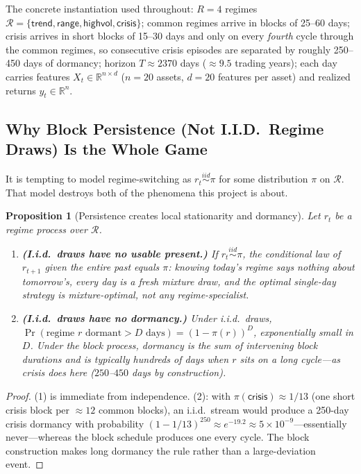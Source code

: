 \documentclass[11pt,a4paper]{article}
\theoremstyle{definition}
\theoremstyle{plain}
\newtheorem{proposition}{Proposition}[section]
\newcommand{\R}{\mathbb{R}}
\begin{document}
The concrete instantiation used throughout: $R = 4$ regimes
$\mathcal{R} = \{\textsf{trend}, \textsf{range}, \textsf{highvol},
\textsf{crisis}\}$; common regimes arrive in blocks of 25--60 days;
\textsf{crisis} arrives in short blocks of 15--30 days and only on every
\emph{fourth} cycle through the common regimes, so consecutive crisis
episodes are separated by roughly 250--450 days of dormancy; horizon
$T \approx 2370$ days ($\approx 9.5$ trading years); each day carries
features $X_t \in \R^{n \times d}$ ($n = 20$ assets, $d = 20$ features per
asset) and realized returns $y_t \in \R^{n}$.

\subsection{Why Block Persistence (Not I.I.D.\ Regime Draws) Is the Whole Game}

It is tempting to model regime-switching as $r_t \stackrel{iid}{\sim} \pi$
for some distribution $\pi$ on $\mathcal{R}$. That model destroys both of the
phenomena this project is about.

\begin{proposition}[Persistence creates local stationarity and dormancy]
\label{prop:dd2-persistence}
Let $r_t$ be a regime process over $\mathcal{R}$.
\begin{enumerate}
  \item \textbf{(I.i.d.\ draws have no usable present.)} If
        $r_t \stackrel{iid}{\sim} \pi$, the conditional law of $r_{t+1}$
        given the entire past equals $\pi$: knowing today's regime says
        nothing about tomorrow's, every day is a fresh mixture draw, and the
        optimal single-day strategy is mixture-optimal, not any
        regime-specialist.
  \item \textbf{(I.i.d.\ draws have no dormancy.)} Under i.i.d.\ draws,
        $\Pr(\text{regime } r \text{ dormant} > D \text{ days})
        = (1 - \pi(r))^{D}$, exponentially small in $D$. Under the block
        process, dormancy is the sum of intervening block durations and is
        typically hundreds of days when $r$ sits on a long cycle---as
        \textsf{crisis} does here ($250$--$450$ days by construction).
\end{enumerate}
\end{proposition}

\begin{proof}
(1) is immediate from independence. (2): with
$\pi(\textsf{crisis}) \approx 1/13$ (one short crisis block per $\approx 12$
common blocks), an i.i.d.\ stream would produce a 250-day crisis dormancy
with probability $(1 - 1/13)^{250} \approx e^{-19.2} \approx 5 \times
10^{-9}$---essentially never---whereas the block schedule produces one every
cycle. The block construction makes long dormancy the rule rather than a
large-deviation event.
\end{proof}
\end{document}
